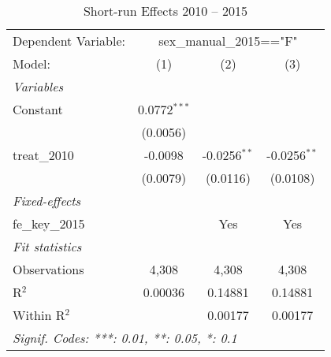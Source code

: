 
\begin{table}[htbp]
   \caption{Short-run Effects 2010 -- 2015}
   \centering
   \begin{tabular}{lccc}
      \tabularnewline \midrule \midrule
      Dependent Variable: & \multicolumn{3}{c}{sex\_manual\_2015=="F"}\\
      Model:          & (1)            & (2)            & (3)\\  
      \midrule
      \emph{Variables}\\
      Constant        & 0.0772$^{***}$ &                &   \\   
                      & (0.0056)       &                &   \\   
      treat\_2010     & -0.0098        & -0.0256$^{**}$ & -0.0256$^{**}$\\   
                      & (0.0079)       & (0.0116)       & (0.0108)\\   
      \midrule
      \emph{Fixed-effects}\\
      fe\_key\_2015   &                & Yes            & Yes\\  
      \midrule
      \emph{Fit statistics}\\
      Observations    & 4,308          & 4,308          & 4,308\\  
      R$^2$           & 0.00036        & 0.14881        & 0.14881\\  
      Within R$^2$    &                & 0.00177        & 0.00177\\  
      \midrule \midrule
      \multicolumn{4}{l}{\emph{Signif. Codes: ***: 0.01, **: 0.05, *: 0.1}}\\
   \end{tabular}
\end{table}


